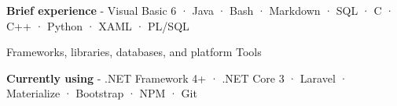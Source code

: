 \begin{cventries}
{\begin{cvitems}
        \item {\textbf{Brief experience} \hspace{0.03cm} - \hspace{0.03cm} Visual Basic 6 \hspace{0.03cm} · \hspace{0.03cm} Java \hspace{0.03cm} · \hspace{0.03cm} Bash \hspace{0.03cm} · \hspace{0.03cm} Markdown \hspace{0.03cm} · \hspace{0.03cm} SQL \hspace{0.03cm} · \hspace{0.03cm} C \hspace{0.03cm} · \hspace{0.03cm} C++ \hspace{0.03cm} · \hspace{0.03cm} Python \hspace{0.03cm} · \hspace{0.03cm} XAML \hspace{0.03cm} · \hspace{0.03cm} PL/SQL \\} %
      \end{cvitems}
    }
  \cventry
    {Frameworks, libraries, databases, and platform} %
    {Tools} %
    {} %
    {} %
    {
      \begin{cvitems} %
        \item {\textbf{Currently using} \hspace{0.03cm} - \hspace{0.03cm}  .NET Framework 4+ \hspace{0.03cm} · \hspace{0.03cm} .NET Core 3 \hspace{0.03cm} · \hspace{0.03cm} Laravel \hspace{0.03cm} · \hspace{0.03cm} Materialize \hspace{0.03cm} · \hspace{0.03cm} Bootstrap \hspace{0.03cm} · \hspace{0.03cm} NPM \hspace{0.03cm} · \hspace{0.03cm} Git} %

\end{cvitems}}
\end{cventries}
